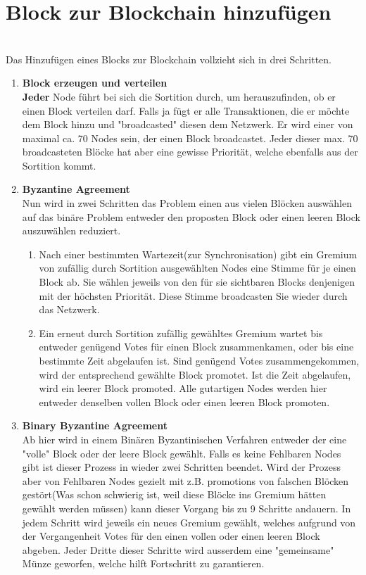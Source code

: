\documentclass[11pt,a4paper]{article}
\begin{document}
\chapter{\textbf{\Large Block zur Blockchain hinzuf\"ugen }}\\
Das Hinzuf\"ugen eines Blocks zur Blockchain vollzieht sich in drei Schritten.
\begin{enumerate}[label=\arabic*)]
	\item \textbf{Block erzeugen und verteilen}\\
	\textbf{Jeder} Node f\"uhrt bei sich die Sortition durch, um herauszufinden, ob er einen Block verteilen darf. Falls ja f\"ugt er alle Transaktionen, die er m\"ochte dem Block hinzu und "broadcasted" diesen dem Netzwerk. Er wird einer von maximal ca. 70 Nodes sein, der einen Block broadcastet. Jeder dieser max. 70 broadcasteten Bl\"ocke hat aber eine gewisse Priorit\"at, welche ebenfalls aus der Sortition kommt.
	 
	\item \textbf{Byzantine Agreement}\\
	Nun wird in zwei Schritten das Problem \grqq{}einen aus vielen Bl\"ocken ausw\"ahlen\grqq{} auf das bin\"are Problem \grqq{}entweder den proposten Block oder einen leeren Block auszuw\"ahlen\grqq{} reduziert.
	\begin{enumerate}[label=\Roman*)]
		\item Nach einer bestimmten Wartezeit(zur Synchronisation) gibt ein Gremium von zuf\"allig durch Sortition ausgew\"ahlten Nodes eine Stimme für je einen Block ab. Sie w\"ahlen jeweils von den für sie sichtbaren Blocks denjenigen mit der h\"ochsten Priorit\"at. Diese Stimme broadcasten Sie wieder durch das Netzwerk.
		
		\item Ein erneut durch Sortition zuf\"allig gew\"ahltes Gremium wartet bis entweder gen\"ugend Votes für einen Block zusammenkamen, oder bis eine bestimmte Zeit abgelaufen ist. 
		Sind gen\"ugend Votes zusammengekommen, wird der entsprechend gew\"ahlte Block promotet.
		Ist die Zeit abgelaufen, wird ein leerer Block promoted. 
		Alle gutartigen Nodes werden hier entweder denselben vollen Block oder einen leeren Block promoten. 
	\end{enumerate}
	\item \textbf{Binary Byzantine Agreement}\\
	Ab hier wird in einem Bin\"aren Byzantinischen Verfahren entweder der eine "volle" Block oder der leere Block gew\"ahlt. Falls es keine Fehlbaren Nodes gibt ist dieser Prozess in wieder zwei Schritten beendet. Wird der Prozess aber von Fehlbaren Nodes gezielt mit z.B. promotions von falschen Blöcken gest\"ort(Was schon schwierig ist, weil diese Bl\"ocke ins Gremium h\"atten gew\"ahlt werden m\"ussen) kann dieser Vorgang bis zu 9 Schritte andauern.
	In jedem Schritt wird jeweils ein neues Gremium gew\"ahlt, welches aufgrund von der Vergangenheit Votes für den einen vollen oder einen leeren Block abgeben. Jeder Dritte dieser Schritte wird ausserdem eine "gemeinsame" Münze geworfen, welche hilft Fortschritt zu garantieren. 
\end{enumerate}
\end{document}
